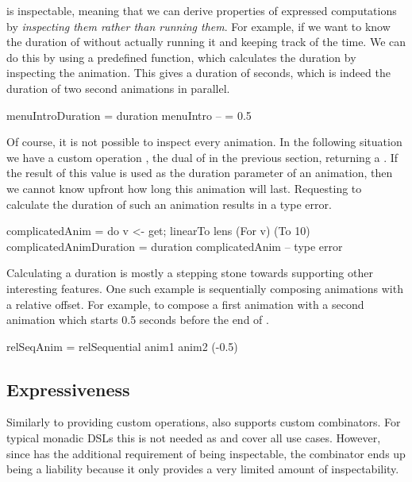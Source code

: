 \dsl{} is inspectable, meaning that we can derive properties of expressed computations by \emph{inspecting them rather than running them}. For example, if we want to know the duration of  without actually running it and keeping track of the time. We can do this by using a predefined  function, which calculates the duration by inspecting the animation. This gives a duration of  seconds, which is indeed the duration of two  second animations in parallel.

\begin{spec}
menuIntroDuration = duration menuIntro -- = 0.5
\end{spec}

Of course, it is not possible to inspect every animation. In the following situation we have a custom operation , the dual of  in the previous section, returning a . If the result of this value is used as the duration parameter of an animation, then we cannot know upfront how long this animation will last. Requesting to calculate the duration of such an animation results in a type error.

\begin{spec}
complicatedAnim = do v <- get; linearTo lens (For v) (To 10)
complicatedAnimDuration = duration complicatedAnim -- type error
\end{spec}

Calculating a duration is mostly a stepping stone towards supporting other interesting features. One such example is sequentially composing animations with a relative offset. For example, to compose a first animation  with a second animation  which starts 0.5 seconds before the end of .

\begin{spec}
relSeqAnim = relSequential anim1 anim2 (-0.5)
\end{spec}

\subsection{Expressiveness}
\label{sec:customcomb}

Similarly to providing custom operations, \dsl{} also supports custom
combinators. For typical monadic DSLs this is not needed as \hs{>>=} and  
cover all use cases.
However, since \dsl{} has the additional requirement of being inspectable, the
\hs{>>=} combinator ends up being a liability because it only provides a very
limited amount of inspectability.

